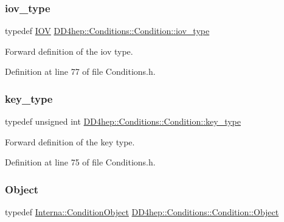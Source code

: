 \subsubsection{\texorpdfstring{iov\+\_\+type}{iov\_type}}
{\footnotesize\ttfamily typedef \hyperlink{class_d_d4hep_1_1_i_o_v}{I\+OV} \hyperlink{class_d_d4hep_1_1_conditions_1_1_condition_ad84300e226b2085ec5e9db7f47be5539}{D\+D4hep\+::\+Conditions\+::\+Condition\+::iov\+\_\+type}}



Forward definition of the iov type. 



Definition at line 77 of file Conditions.\+h.

\hypertarget{class_d_d4hep_1_1_conditions_1_1_condition_a7528efa762e8cc072ef80ea67c3531f9}{}\label{class_d_d4hep_1_1_conditions_1_1_condition_a7528efa762e8cc072ef80ea67c3531f9} 
\subsubsection{\texorpdfstring{key\+\_\+type}{key\_type}}
{\footnotesize\ttfamily typedef unsigned int \hyperlink{class_d_d4hep_1_1_conditions_1_1_condition_a7528efa762e8cc072ef80ea67c3531f9}{D\+D4hep\+::\+Conditions\+::\+Condition\+::key\+\_\+type}}



Forward definition of the key type. 



Definition at line 75 of file Conditions.\+h.

\hypertarget{class_d_d4hep_1_1_conditions_1_1_condition_a6fc8dae0dad41db6a237920c85f8a55d}{}\label{class_d_d4hep_1_1_conditions_1_1_condition_a6fc8dae0dad41db6a237920c85f8a55d} 
\subsubsection{\texorpdfstring{Object}{Object}}
{\footnotesize\ttfamily typedef \hyperlink{class_d_d4hep_1_1_conditions_1_1_interna_1_1_condition_object}{Interna\+::\+Condition\+Object} \hyperlink{class_d_d4hep_1_1_conditions_1_1_condition_a6fc8dae0dad41db6a237920c85f8a55d}{D\+D4hep\+::\+Conditions\+::\+Condition\+::\+Object}}




